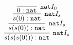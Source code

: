 \documentclass[crop]{standalone} %
\begin{document}
$\displaystyle
\infer[\texttt{nat} I_s]{
    s(s(s(0))) : \texttt{nat}
}{
    \infer[\texttt{nat} I_s]{
        s(s(0)) : \texttt{nat}
    }{
        \infer[\texttt{nat} I_s]{
            s(0) : \texttt{nat}
        }{
            \infer[\texttt{nat} I_0]{
                0 : \texttt{nat}
            }{}
        }
    }
}
$
\end{document}
